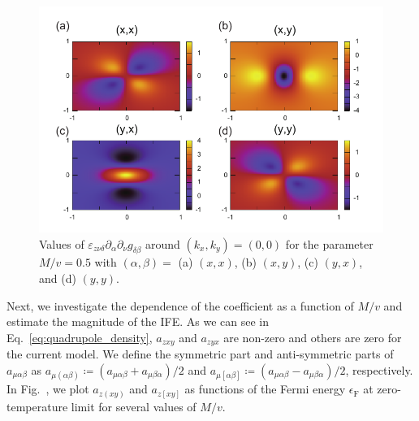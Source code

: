 \documentclass[aps,prb,longbibliography,superscriptaddress,twocolumn]{revtex4-2}
\begin{document}
\begin{figure}[t]
    \begin{center}
        \includegraphics[width=\columnwidth]{fig_IFE/asym_density.pdf}
    \end{center}
    \caption{Values of $\varepsilon_{z\nu\delta}\partial_{\alpha}\partial_{\nu}g_{\delta\beta}$ around $(k_x,k_y)=(0,0)$ for the parameter $M/v=0.5$ with $(\alpha,\beta)=$ (a) $(x,x)$, (b) $(x,y)$, (c) $(y,x)$, and (d) $(y,y)$.}
    \label{fig:asym_density}
\end{figure}

Next, we investigate the dependence of the coefficient as a function of $M/v$ and estimate the magnitude of the IFE. As we can see in Eq.~\eqref{eq:quadrupole_density}, $a_{zxy}$ and $a_{zyx}$ are non-zero and others are zero for the current model. We define the symmetric part and anti-symmetric parts of $a_{\mu\alpha\beta}$ as $a_{\mu(\alpha\beta)}\coloneqq (a_{\mu\alpha\beta}+a_{\mu\beta\alpha})/2$ and $a_{\mu[\alpha\beta]}\coloneqq (a_{\mu\alpha\beta}-a_{\mu\beta\alpha})/2$, respectively. In Fig.~, we plot $a_{z(xy)}$ and $a_{z[xy]}$ as functions of the Fermi energy $\epsilon_\mathrm{F}$ at zero-temperature limit for several values of $M/v$. 


\end{document}
